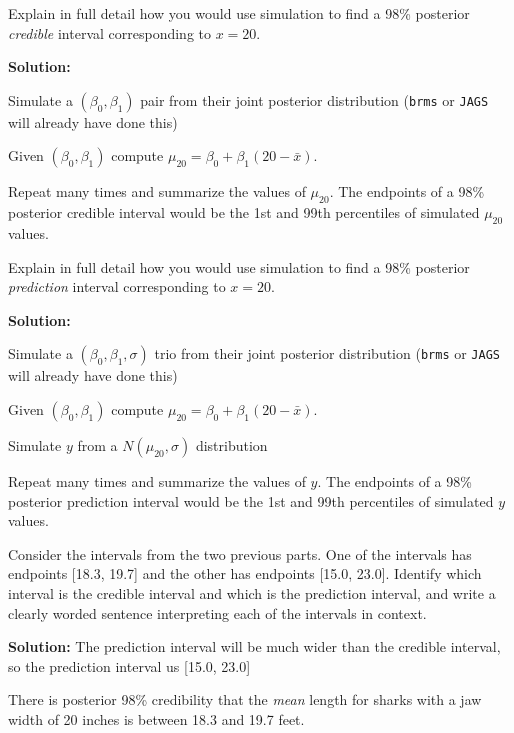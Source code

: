 \documentclass[11pt]{article}
\theoremstyle{definition}
\newenvironment{my_itemize}{
	\begin{itemize}
		\setlength{\itemsep}{0pt}
		\setlength{\parskip}{0pt}
		\setlength{\topsep}{0pt}
		\setlength{\partopsep}{-1pt}
		\setlength{\parsep}{-1pt}}{\end{itemize}
}
\newcommand{\bei}{\begin{my_itemize}}
\newcommand{\eei}{\end{my_itemize}}
\newcommand{\ans}{\textbf{Solution: }}
\begin{document}
\fi 
\item Explain in full detail how you would use simulation to find a 98\% posterior \emph{credible} interval corresponding to $x=20$.

\ifanswers

\ans
\bei
\item Simulate a $(\beta_0, \beta_1)$ pair from their joint posterior distribution (\texttt{brms} or \texttt{JAGS} will already have done this)
\item Given $(\beta_0, \beta_1)$ compute $\mu_{20} = \beta_0 + \beta_1(20-\bar{x})$.
\item Repeat many times and summarize the values of $\mu_{20}$. The endpoints of a 98\% posterior credible interval would be the 1st and 99th percentiles of simulated $\mu_{20}$ values.
\eei 

\fi 


\item Explain in full detail how you would use simulation to find a 98\% posterior \emph{prediction} interval corresponding to $x=20$.

\ifanswers

\ans
\bei
\item Simulate a $(\beta_0, \beta_1, \sigma)$ trio from their joint posterior distribution (\texttt{brms} or \texttt{JAGS} will already have done this)
\item Given $(\beta_0, \beta_1)$ compute $\mu_{20} = \beta_0 + \beta_1(20-\bar{x})$.
\item Simulate $y$ from a $N(\mu_{20}, \sigma)$ distribution
\item Repeat many times and summarize the values of $y$. The endpoints of a 98\% posterior prediction interval would be the 1st and 99th percentiles of simulated $y$ values.
\eei 

\fi 



\item Consider the intervals from the two previous parts. One of the intervals has endpoints
[18.3, 19.7] and the other has endpoints [15.0, 23.0]. Identify which interval is the credible interval and which is the prediction interval, and write a clearly worded sentence
interpreting each of the intervals in context.


\ifanswers

\ans
The prediction interval will be much wider than the credible interval, so the prediction interval us [15.0, 23.0]

There is posterior 98\% credibility that the \emph{mean} length for sharks with a jaw width of 20 inches is between 18.3 and 19.7 feet.
\end{document}
